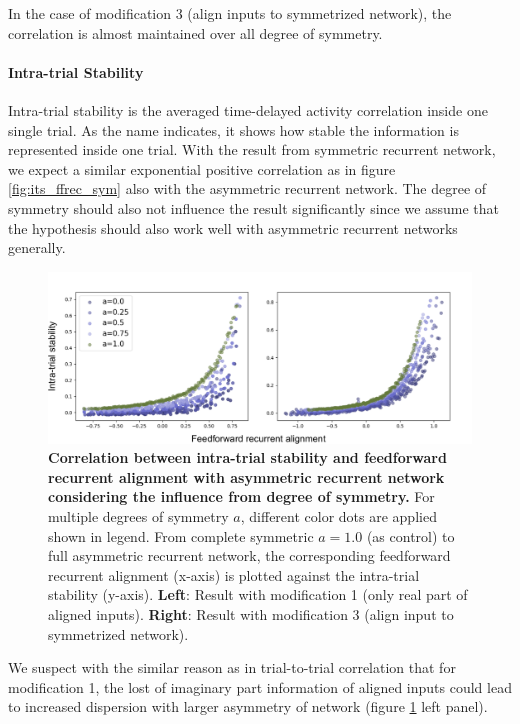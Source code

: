 \documentclass[11pt]{article}
\begin{document}
	In the case of modification 3 (align inputs to symmetrized network), the correlation is almost maintained over all degree of symmetry. 
	
	\paragraph{Intra-trial Stability}
	
	Intra-trial stability is the averaged time-delayed activity correlation inside one single trial. As the name indicates, it shows how stable the information is represented inside one trial. With the result from symmetric recurrent network, we expect a similar exponential positive correlation as in figure \ref{fig:its_ffrec_sym} also with the asymmetric recurrent network. The degree of symmetry should also not influence the result significantly since we assume that the hypothesis should also work well with asymmetric recurrent networks generally.
		\begin{figure}[H]
			\centering
			\includegraphics[width=\textwidth]{../figures/its_asym.pdf}
			\caption{\textbf{Correlation between intra-trial stability and feedforward recurrent alignment with asymmetric recurrent network considering the influence from degree of symmetry.} For multiple degrees of symmetry $a$, different color dots are applied shown in legend. From complete symmetric $a = 1.0$ (as control) to full asymmetric recurrent network, the corresponding feedforward recurrent alignment (x-axis) is plotted against the intra-trial stability (y-axis). \textbf{Left}: Result with modification 1 (only real part of aligned inputs). \textbf{Right}: Result with modification 3 (align input to symmetrized network).}
			\label{fig:its_asym}
		\end{figure}
	We suspect with the similar reason as in trial-to-trial correlation that for modification 1, the lost of imaginary part information of aligned inputs could lead to increased dispersion with larger asymmetry of network (figure \ref{fig:its_asym} left panel). 
	
\end{document}
